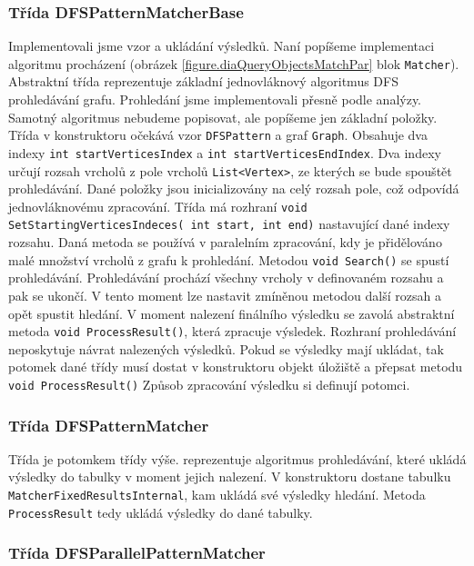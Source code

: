 \subsubsection{Třída DFSPatternMatcherBase}

Implementovali jsme vzor a ukládání výsledků.
Naní popíšeme implementaci algoritmu procházení (obrázek \ref{figure.diaQueryObjectsMatchPar} blok \texttt{Matcher}).
Abstraktní třída reprezentuje základní jednovláknový algoritmus DFS prohledávání grafu.
Prohledání jsme implementovali přesně podle analýzy.
Samotný algoritmus nebudeme popisovat, ale popíšeme jen základní položky.
Třída v konstruktoru očekává vzor \texttt{DFSPattern} a graf \texttt{Graph}.
Obsahuje dva indexy \texttt{int startVerticesIndex} a \texttt{int startVerticesEndIndex}.
Dva indexy určují rozsah vrcholů z pole vrcholů \texttt{List<Vertex>}, ze kterých se bude spouštět prohledávání.
Dané položky jsou inicializovány na celý rozsah pole, což odpovídá jednovláknovému zpracování.
Třída má rozhraní \texttt{void SetStartingVerticesIndeces( int start, int end)} nastavující dané indexy rozsahu.
Daná metoda se používá v paralelním zpracování, kdy je přidělováno malé množství vrcholů z grafu k prohledání.
Metodou \texttt{void Search()} se spustí prohledávání.
Prohledávání prochází všechny vrcholy v definovaném rozsahu a pak se ukončí.
V tento moment lze nastavit zmíněnou metodou další rozsah a opět spustit hledání.
V moment nalezení finálního výsledku se zavolá abstraktní metoda \texttt{void ProcessResult()}, která zpracuje výsledek.
Rozhraní prohledávání neposkytuje návrat nalezených výsledků.
Pokud se výsledky mají ukládat, tak potomek dané třídy musí dostat v konstruktoru objekt úložiště a přepsat metodu \texttt{void ProcessResult()}
Způsob zpracování výsledku si definují potomci.

\subsubsection{Třída DFSPatternMatcher}

Třída je potomkem třídy výše.
reprezentuje algoritmus prohledávání, které ukládá výsledky do tabulky v moment jejich nalezení.
V konstruktoru dostane tabulku \texttt{MatcherFixedResultsInternal}, kam ukládá své výsledky hledání.
Metoda \texttt{ProcessResult} tedy ukládá výsledky do dané tabulky.

\subsubsection{Třída DFSParallelPatternMatcher}

